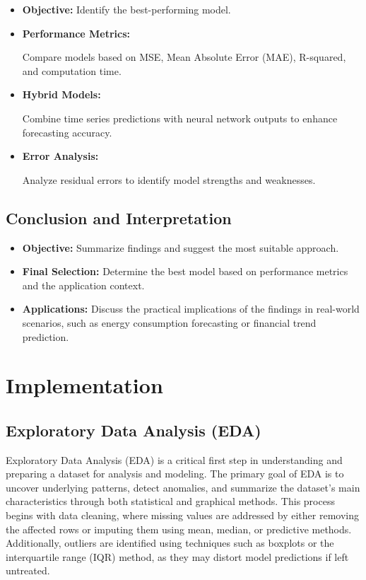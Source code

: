 \documentclass[english,12pt, titlepage]{article}
\begin{document}
	\begin{itemize}
		\item \textbf{ Objective:} Identify the best-performing model.
		\item 	\textbf{Performance Metrics:}
		
		Compare models based on MSE, Mean Absolute Error (MAE), R-squared, and computation time.
		\item \textbf{	Hybrid Models:}
		
		Combine time series predictions with neural network outputs to enhance forecasting accuracy.
		\item \textbf{	Error Analysis:}
		
		Analyze residual errors to identify model strengths and weaknesses.
	\end{itemize}
	
	\subsection{Conclusion and Interpretation}
	\begin{itemize}
		\item  \textbf{	Objective: }Summarize findings and suggest the most suitable approach.
		\item 	\textbf{Final Selection:}
		Determine the best model based on performance metrics and the application context.
		\item 	\textbf{Applications:}
		Discuss the practical implications of the findings in real-world scenarios, such as energy consumption forecasting or financial trend prediction.
	\end{itemize}
	
	
	
	\newpage
	\section{Implementation}
	\subsection{Exploratory Data Analysis (EDA)}
	Exploratory Data Analysis (EDA) is a critical first step in understanding and preparing a dataset for analysis and modeling. The primary goal of EDA is to uncover underlying patterns, detect anomalies, and summarize the dataset’s main characteristics through both statistical and graphical methods. This process begins with data cleaning, where missing values are addressed by either removing the affected rows or imputing them using mean, median, or predictive methods. Additionally, outliers are identified using techniques such as boxplots or the interquartile range (IQR) method, as they may distort model predictions if left untreated.
	
\end{document}
